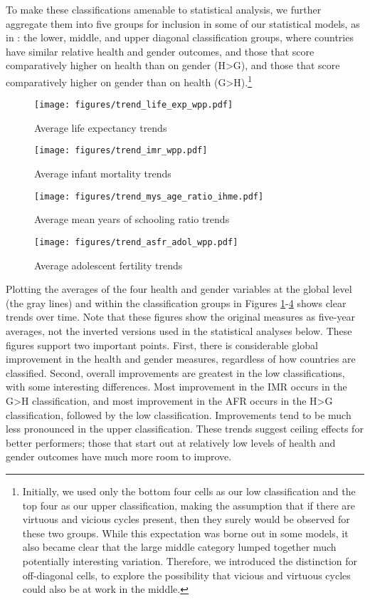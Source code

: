 \documentclass[12pt]{article}
\begin{document}


To make these classifications amenable to statistical analysis, we further aggregate them into five groups for inclusion in some of our statistical models, as in : the lower, middle, and upper diagonal classification groups, where countries have similar relative health and gender outcomes, and those that score comparatively higher on health than on gender ({H>G}), and those that score comparatively higher on gender than on health ({G>H}).\footnote{
Initially, we used only the bottom four cells as our low classification and the top four as our upper classification, making the assumption that if there are virtuous and vicious cycles present, then they surely would be observed for these two groups. While this expectation was borne out in some models, it also became clear that the large middle category lumped together much potentially interesting variation. Therefore, we introduced the distinction for off-diagonal cells, to explore the possibility that vicious and virtuous cycles could also be at work in the middle.}

\begin{figure}
    \centering
    \caption{Average life expectancy trends}
    \label{trends_life expectancy}
    \texttt{[image: figures/trend\_life\_exp\_wpp.pdf]}
\end{figure}
\begin{figure}
    \centering
    \caption{Average infant mortality trends}
    \label{trends_imr}
    \texttt{[image: figures/trend\_imr\_wpp.pdf]}
\end{figure}
\begin{figure}
    \centering
    \caption{Average mean years of schooling ratio trends}
    \label{trends_mys}
    \texttt{[image: figures/trend\_mys\_age\_ratio\_ihme.pdf]}
\end{figure}
\begin{figure}
    \centering
    \caption{Average adolescent fertility trends}
    \label{trends_afr}
    \texttt{[image: figures/trend\_asfr\_adol\_wpp.pdf]}
\end{figure}

Plotting the averages of the four health and gender variables at the global level (the gray lines) and within the classification groups in Figures \ref{trends_life expectancy}-\ref{trends_afr} shows clear trends over time.
Note that these figures show the original measures as five-year averages, not the inverted versions used in the statistical analyses below.
These figures support two important points.
First, there is considerable global improvement in the health and gender measures, regardless of how countries are classified.
Second, overall improvements are greatest in the low classifications, with some interesting differences. Most improvement in the IMR occurs in the {G>H} classification, and most improvement in the AFR occurs in the {H>G} classification, followed by the low classification.
Improvements tend to be much less pronounced in the upper classification.
These trends suggest ceiling effects for better performers; those that start out at relatively low levels of health and gender outcomes have much more room to improve.
\end{document}
